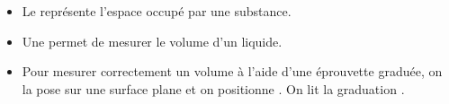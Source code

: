 \begin{mybilan}
	\begin{itemize}
		\item Le  représente l'espace occupé par une substance.
		\item Une  permet de mesurer le volume d'un liquide.
		\item Pour mesurer correctement un volume à l'aide d'une éprouvette graduée, on la pose sur une surface plane et on positionne . On lit la graduation .
	\end{itemize}
\end{mybilan}